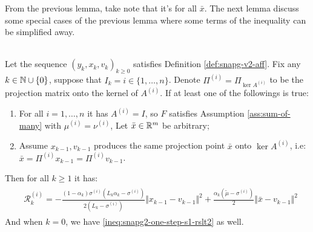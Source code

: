 \documentclass[12pt]{article}
\begin{document}
    From the previous lemma, take note that it's for all $\bar x$. 
    The next lemma discuss some special cases of the previous lemma where some terms of the inequality can be simplified away. 
    \begin{lemma}\;\label{snapg2-one-step-s2-proto}\\
        Let the sequence $(y_k, x_k, v_k)_{k \ge 0}$ satisfies Definition \ref{def:snapg-v2-aff}. 
        Fix any $k \in \mathbb N \cup\{0\}$, suppose that $I_k = i \in \{1, \ldots, n\}$.
        Denote $\Pi^{(i)} = \Pi_{\ker A^{(i)}}$ to be the projection matrix onto the kernel of $A^{(i)}$. 
        If at least one of the followings is true: 
        \begin{enumerate}[nosep]
            \item For all $i = 1, \ldots, n$ it has $A^{(i)} = I$, so $F$ satisfies Assumption \ref{ass:sum-of-many} with $\mu^{(i)} = \nu^{(i)}$, Let $\bar x \in \mathbb R^m$ be arbitrary;
            \item Assume $x_{k - 1}, v_{k - 1}$ produces the same projection point $\bar x$ onto $\ker A^{(i)}$, i.e: $\bar x = \Pi^{(i)} x_{k - 1} = \Pi^{(i)} v_{k - 1}$. 
        \end{enumerate}
        Then for all $k \ge 1$ it has: 
        \begin{align}\begin{split}
            & \mathcal R_k^{(i)} = 
            - \frac{(1 - \alpha_k)\sigma^{(i)}\left(L_k\alpha_k - \sigma^{(i)}\right)}{2\left(L_k - \sigma^{(i)}\right)}\Vert x_{k - 1} - v_{k - 1} \Vert^2
            + \frac{\alpha_k(\tilde\mu - \sigma^{(i)})}{2} \Vert \bar x - v_{k - 1}\Vert^2
        \end{split}\end{align}
        And when $k = 0$, we have \eqref{ineq:snapg2-one-step-s1-rslt2} as well. 
    \end{lemma}
\end{document}
